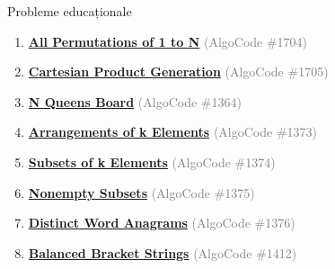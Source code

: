 ﻿\documentclass[10pt]{beamer}
\begin{document}
\begin{frame}{Probleme educaționale}
  \begin{enumerate}\footnotesize\itemsep1pt
    \item \href{https://code.algolymp.com/problems/1704}{\textbf{All Permutations of 1 to N}}
          \textcolor{gray}{(AlgoCode \#1704)}
    \item \href{https://code.algolymp.com/problems/1705}{\textbf{Cartesian Product Generation}}
          \textcolor{gray}{(AlgoCode \#1705)}
    \item \href{https://code.algolymp.com/problems/1364}{\textbf{N Queens Board}}
          \textcolor{gray}{(AlgoCode \#1364)}
    \item \href{https://code.algolymp.com/problems/1373}{\textbf{Arrangements of k Elements}}
          \textcolor{gray}{(AlgoCode \#1373)}
    \item \href{https://code.algolymp.com/problems/1374}{\textbf{Subsets of k Elements}}
          \textcolor{gray}{(AlgoCode \#1374)}
    \item \href{https://code.algolymp.com/problems/1375}{\textbf{Nonempty Subsets}}
          \textcolor{gray}{(AlgoCode \#1375)}
    \item \href{https://code.algolymp.com/problems/1376}{\textbf{Distinct Word Anagrams}}
          \textcolor{gray}{(AlgoCode \#1376)}
    \item \href{https://code.algolymp.com/problems/1412}{\textbf{Balanced Bracket Strings}}
          \textcolor{gray}{(AlgoCode \#1412)}
  \end{enumerate}
\end{frame}
\end{document}
